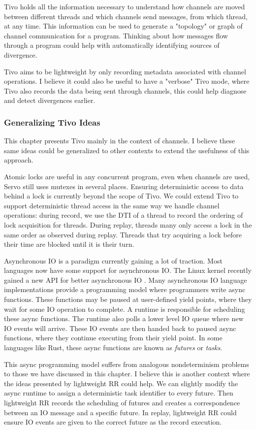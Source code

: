 Tivo holds all the information necessary to understand how channels are moved between different threads and which channels send messages, from which thread, at any time. This information can be used to generate a "topology" or graph of channel communication for a program. Thinking about how messages flow through a program could help with automatically identifying sources of divergence.

Tivo aims to be lightweight by only recording metadata associated with channel operations. I believe it could also be useful to have a "verbose" Tivo mode, where Tivo also records the data being sent through channels, this could help diagnose and detect divergences earlier.

\subsubsection{Generalizing Tivo Ideas}
This chapter presents Tivo mainly in the context of channels. I believe these same ideas could be generalized to other contexts to extend the usefulness of this approach.

Atomic locks are useful in any concurrent program, even when channels are used, Servo still uses mutexes in several places. Ensuring deterministic access to data behind a lock is currently beyond the scope of Tivo. We could extend Tivo to support deterministic thread access in the same way we handle channel operations: during record, we use the DTI of a thread to record the ordering of lock acquisition for threads. During replay, threads many only access a lock in the same order as observed during replay. Threads that try acquiring a lock before their time are blocked until it is their turn.

Asynchronous IO is a paradigm currently gaining a lot of traction. Most languages now have some support for asynchronous IO. The Linux kernel recently gained a new API for better asynchronous IO \cite{io-uring}. Many asynchronous IO language implementations provide a programming model where programmers write async functions. These functions may be paused at user-defined yield points, where they wait for some IO operation to complete. A runtime is responsible for scheduling these async functions. The runtime also polls a lower level IO queue where new IO events will arrive. These IO events are then handed back to paused async functions, where they continue executing from their yield point. In some languages like Rust, these async functions are known as \textit{futures} or \textit{tasks}.

This async programming model suffers from analogous nondeterminism problems to those we have discussed in this chapter. I believe this is another context where the ideas presented by lightweight RR could help. We can slightly modify the async runtime to assign a deterministic task identifier to every future. Then lightweight RR records the scheduling of futures and creates a correspondence between an IO message and a specific future. In replay, lightweight RR could ensure IO events are given to the correct future as the record execution.